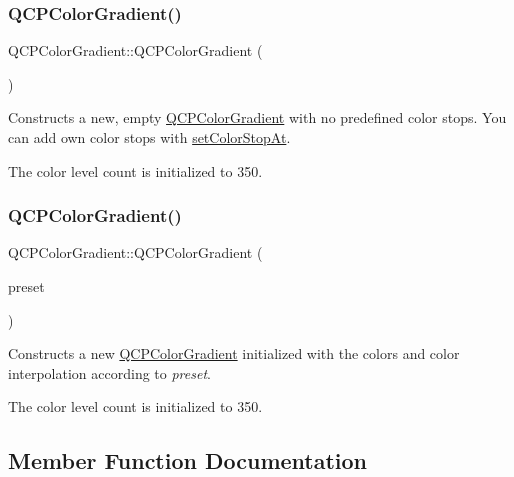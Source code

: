 \subsubsection{\texorpdfstring{Q\+C\+P\+Color\+Gradient()}{QCPColorGradient()}\hspace{0.1cm}{\footnotesize\ttfamily [1/2]}}
{\footnotesize\ttfamily Q\+C\+P\+Color\+Gradient\+::\+Q\+C\+P\+Color\+Gradient (\begin{DoxyParamCaption}{ }\end{DoxyParamCaption})}

Constructs a new, empty \hyperlink{class_q_c_p_color_gradient}{Q\+C\+P\+Color\+Gradient} with no predefined color stops. You can add own color stops with \hyperlink{class_q_c_p_color_gradient_a3b48be5e78079db1bb2a1188a4c3390e}{set\+Color\+Stop\+At}.

The color level count is initialized to 350. \mbox{\label{class_q_c_p_color_gradient_a4e570b4004fd60bd135e52d685ed2b66}} 
\subsubsection{\texorpdfstring{Q\+C\+P\+Color\+Gradient()}{QCPColorGradient()}\hspace{0.1cm}{\footnotesize\ttfamily [2/2]}}
{\footnotesize\ttfamily Q\+C\+P\+Color\+Gradient\+::\+Q\+C\+P\+Color\+Gradient (\begin{DoxyParamCaption}\item[{\hyperlink{class_q_c_p_color_gradient_aed6569828fee337023670272910c9072}{Gradient\+Preset}}]{preset }\end{DoxyParamCaption})}

Constructs a new \hyperlink{class_q_c_p_color_gradient}{Q\+C\+P\+Color\+Gradient} initialized with the colors and color interpolation according to {\itshape preset}.

The color level count is initialized to 350. 

\subsection{Member Function Documentation}
\mbox{\label{class_q_c_p_color_gradient_a939213e85f0d1279519d555c5fcfb6ad}} 
